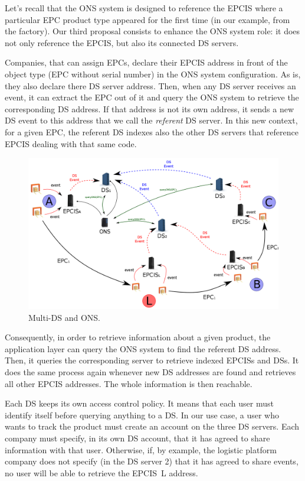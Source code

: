 \documentclass[a4paper]{llncs}
\begin{document}
Let's recall that the ONS system is designed to reference the EPCIS where a particular EPC product
type appeared for the first time (in our example, from the factory). Our third proposal consists to
enhance the ONS system role: it does not only reference the EPCIS, but also its connected DS
servers.

Companies, that can assign EPCs, declare their EPCIS address in front of the object type (EPC
without serial number) in the ONS system configuration. As is, they also declare there DS server
address. Then, when any DS server receives an event, it can extract the EPC out of it and query the
ONS system to retrieve the corresponding DS address. If that address is not its own address, it
sends a new DS event to this address that we call the \emph{referent} DS server. In this new
context, for a given EPC, the referent DS indexes also the other DS servers that reference EPCIS
dealing with that same code.

\begin{figure}[htb]
\center
\includegraphics[width=.8\textwidth]{img/platform-3.png}
\caption{Multi-DS and ONS.}
\label{dsons}
\end{figure}

Consequently, in order to retrieve information about a given product, the application layer can
query the ONS system to find the referent DS address. Then, it queries the corresponding server to
retrieve indexed EPCISs and DSs. It does the same process again whenever new DS addresses are found
and retrieves all other EPCIS addresses. The whole information is then reachable.

Each DS keeps its own access control policy. It means that each user must identify itself before
querying anything to a DS. In our use case, a user who wants to track the product must create an
account on the three DS servers. Each company must specify, in its own DS account, that it has
agreed to share information with that user. Otherwise, if, by example, the logistic platform company
does not specify (in the DS server 2) that it has agreed to share events, no user will be able to
retrieve the EPCIS~L address. 
\end{document}
